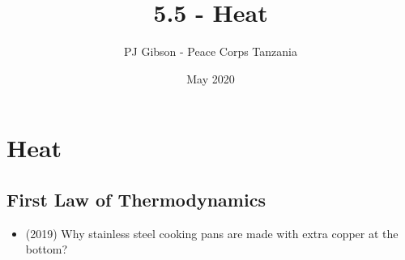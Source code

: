 \documentclass{article}
\title{5.5 - Heat}
\author{PJ Gibson - Peace Corps Tanzania}
\date{May 2020}
\begin{document}
\maketitle


\section{Heat}

\subsection{First Law of Thermodynamics}
\begin{itemize}
\item (2019)  Why stainless steel cooking pans are made with extra copper at the bottom?
\end{itemize}
\end{document}
